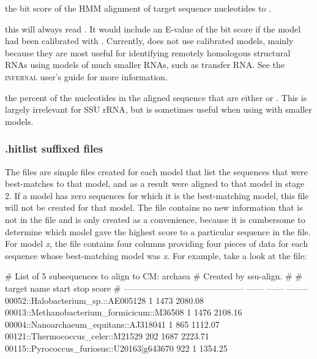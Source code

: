 \begin{wideitem}

\item[\emprog{bit sc}] the bit score of the HMM alignment of
  target sequence nucleotides  to .

\item[\emprog{E-value}] this will always read \prog{-}. It would
  include an E-value of the bit score if the model had been calibrated
  with . Currently,  does not use
  calibrated models, mainly because they are most useful for
  identifying remotely homologous structural RNAs using models of
  much smaller RNAs, such as transfer RNA. See the \textsc{infernal} 
  user's guide \cite{Nawrocki09} for more information.

\item[\emprog{GC\%}] the percent of the nucleotides in the aligned
  sequence that are either  or . This is largely
  irrelevant for SSU rRNA, but is sometimes useful when using
   with smaller models.
\end{wideitem}

\subsubsection{.hitlist suffixed files}

The  files are simple files created for each model
that list the sequences that were best-matches to that model, and as a
result were aligned to that model in stage 2. If a model has zero
sequences for which it is the best-matching model, this file will not
be created for that model. The file contains no new information that is not in the
 file and is only created as a convenience, because it is
cumbersome to determine which model gave the highest score to a
particular sequence in the  file.  For model \emph{x}, the
 file contains four columns providing four pieces of
data for each sequence whose best-matching model was \emph{x}. For
example, take a look at the 
file:

\begin{sreoutput}
# List of 5 subsequences to align to CM: archaea
# Created by ssu-align.
#
# target name                                  start    stop     score
# ------------------------------------------  ------  ------  --------
  00052::Halobacterium_sp.::AE005128               1    1473   2080.08
  00013::Methanobacterium_formicicum::M36508       1    1476   2108.16
  00004::Nanoarchaeum_equitans::AJ318041           1     865   1112.07
  00121::Thermococcus_celer::M21529              202    1687   2223.71
  00115::Pyrococcus_furiosus::U20163|g643670     922       1   1354.25
\end{sreoutput}

